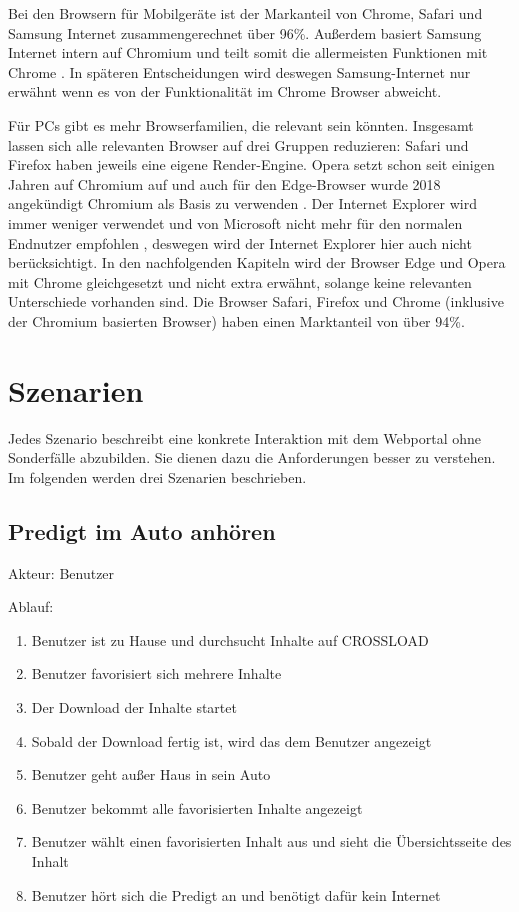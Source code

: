Bei den Browsern für Mobilgeräte ist der Markanteil von Chrome, Safari und Samsung Internet zusammengerechnet über 96\%. Außerdem basiert Samsung Internet intern auf Chromium und teilt somit die allermeisten Funktionen mit Chrome \autocite{samsung-webkit}. In späteren Entscheidungen wird deswegen Samsung-Internet nur erwähnt wenn es von der Funktionalität im Chrome Browser abweicht.

Für PCs gibt es mehr Browserfamilien, die relevant sein könnten. Insgesamt lassen sich alle relevanten Browser auf drei Gruppen reduzieren: Safari und Firefox haben jeweils eine eigene Render-Engine. Opera setzt schon seit einigen Jahren auf Chromium auf \autocite{opera-webkit} und auch für den Edge-Browser wurde 2018 angekündigt Chromium als Basis zu verwenden \autocite{edge-faq}. Der Internet Explorer wird immer weniger verwendet und von Microsoft nicht mehr für den normalen Endnutzer empfohlen \autocite{edge-faq}, deswegen wird der Internet Explorer hier auch nicht berücksichtigt. In den nachfolgenden Kapiteln wird der Browser Edge und Opera mit Chrome gleichgesetzt und nicht extra erwähnt, solange keine relevanten Unterschiede vorhanden sind. Die Browser Safari, Firefox und Chrome (inklusive der Chromium basierten Browser) haben einen Marktanteil von über 94\%.

\section{Szenarien}
Jedes Szenario beschreibt eine konkrete Interaktion mit dem Webportal ohne Sonderfälle abzubilden. Sie dienen dazu die Anforderungen besser zu verstehen. Im folgenden werden drei Szenarien beschrieben.

\subsection{Predigt im Auto anhören}
Akteur: Benutzer

Ablauf:
\begin{enumerate}
	\item Benutzer ist zu Hause und durchsucht Inhalte auf CROSSLOAD
	\item Benutzer favorisiert sich mehrere Inhalte
	\item Der Download der Inhalte startet
	\item Sobald der Download fertig ist, wird das dem Benutzer angezeigt
	\item Benutzer geht außer Haus in sein Auto
	\item Benutzer bekommt alle favorisierten Inhalte angezeigt
	\item Benutzer wählt einen favorisierten Inhalt aus und sieht die Übersichtsseite des Inhalt
	\item Benutzer hört sich die Predigt an und benötigt dafür kein Internet
\end{enumerate}

